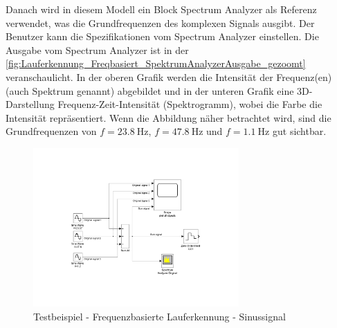 Danach wird in diesem Modell ein Block \glqq Spectrum Analyzer\grqq{} als Referenz verwendet, was die Grundfrequenzen des komplexen Signals ausgibt. Der Benutzer kann die Spezifikationen vom \glqq Spectrum Analyzer\grqq{} einstellen. Die Ausgabe vom \glqq Spectrum Analyzer\grqq{} ist in der \autoref{fig:Lauferkennung_Freqbasiert_SpektrumAnalyzerAusgabe_gezoomt} veranschaulicht. In der oberen Grafik werden die Intensität der Frequenz(en) (auch Spektrum genannt) abgebildet und in der unteren Grafik eine 3D-Darstellung \glqq Frequenz-Zeit-Intensität\grqq{} (Spektrogramm), wobei die Farbe die Intensität repräsentiert. Wenn die Abbildung näher betrachtet wird, sind die Grundfrequenzen von $f=\SI{23,8}{\hertz}$, $f=\SI{47,8}{\hertz}$ und $f=\SI{1,1}{\hertz}$ gut sichtbar.

\begin{figure}
	\centering
	\includegraphics[width=0.7\textwidth]{Bilder/Lauferkennung_Freqbasiert_TestBeispiel_SinussignalGenerator.pdf}
	\caption{Testbeispiel - Frequenzbasierte Lauferkennung - Sinussignal}
	\label{fig:Lauferkennung_Freqbasiert_TestBeispiel_SinussignalGenerator}
\end{figure}


